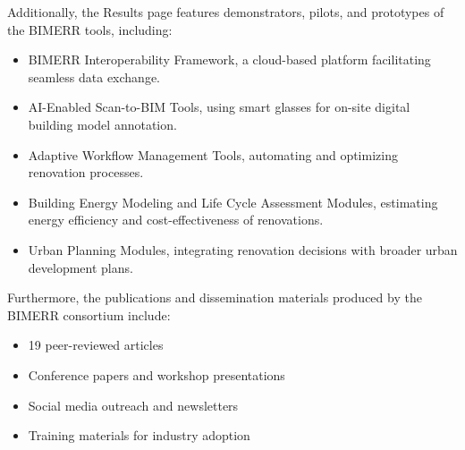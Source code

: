 Additionally, the Results page features demonstrators, pilots, and prototypes of the BIMERR tools, including:
\begin{itemize}
    \item BIMERR Interoperability Framework, a cloud-based platform facilitating seamless data exchange.
    \item AI-Enabled Scan-to-BIM Tools, using smart glasses for on-site digital building model annotation.
    \item Adaptive Workflow Management Tools, automating and optimizing renovation processes.
    \item Building Energy Modeling and Life Cycle Assessment Modules, estimating energy efficiency and cost-effectiveness of renovations.
    \item Urban Planning Modules, integrating renovation decisions with broader urban development plans.
\end{itemize}

Furthermore, the publications and dissemination materials produced by the BIMERR consortium include:
\begin{itemize}
    \item 19 peer-reviewed articles
    \item Conference papers and workshop presentations
    \item Social media outreach and newsletters
    \item Training materials for industry adoption
\end{itemize}